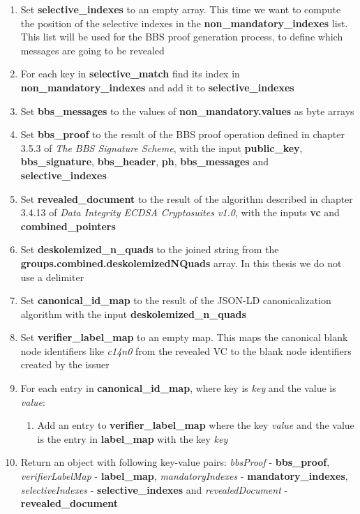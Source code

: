 \documentclass[
	a4paper               %
	,BCOR=0mm            %
	,bibliography=totoc   %
	,listof=totoc         %
	,monolingual
	,twoside=false
]{bfhthesis}              %
\begin{document}
\begin{enumerate}
	\item Set \textbf{selective\_indexes} to an empty array. This time we want to compute the position of the selective indexes in the \textbf{non\_mandatory\_indexes} list. This list will be used for the BBS proof generation process, to define which messages are going to be revealed
	\item For each key in \textbf{selective\_match} find its index in \textbf{non\_mandatory\_indexes} and add it to \textbf{selective\_indexes}
	\item Set \textbf{bbs\_messages} to the values of \textbf{non\_mandatory.values} as byte arrays
	\item Set \textbf{bbs\_proof} to the result of the BBS proof operation defined in chapter 3.5.3 of \textit{The BBS Signature Scheme}\cite{bbs-signature-scheme}, with the input \textbf{public\_key}, \textbf{bbs\_signature}, \textbf{bbs\_header}, \textbf{ph}, \textbf{bbs\_messages} and \textbf{selective\_indexes}
	\item Set \textbf{revealed\_document} to the result of the algorithm described in chapter 3.4.13 of \textit{Data Integrity ECDSA Cryptosuites v1.0}\cite{ecdsa}, with the inputs \textbf{vc} and \\\textbf{combined\_pointers}
	\item Set \textbf{deskolemized\_n\_quads} to the joined string from the \\\textbf{groups.combined.deskolemizedNQuads} array. In this thesis we do not use a delimiter
	\item Set \textbf{canonical\_id\_map} to the result of the JSON-LD canonicalization algorithm with the input \textbf{deskolemized\_n\_quads}
	\item Set \textbf{verifier\_label\_map} to an empty map. This maps the canonical blank node identifiers like \textit{c14n0} from the revealed VC to the blank node identifiers created by the issuer
	\item For each entry in \textbf{canonical\_id\_map}, where key is \textit{key} and the value is \textit{value}:
	\begin{enumerate}
		\item Add an entry to \textbf{verifier\_label\_map} where the key \textit{value} and the value is the entry in \textbf{label\_map} with the key \textit{key}
	\end{enumerate}
	\item Return an object with following key-value pairs: \textit{bbsProof} - \textbf{bbs\_proof}, \textit{verifierLabelMap} - \textbf{label\_map}, \textit{mandatoryIndexes} - \textbf{mandatory\_indexes}, \textit{selectiveIndexes} - \textbf{selective\_indexes} and \textit{revealedDocument} - \textbf{revealed\_document}
\end{enumerate}
\end{document}
